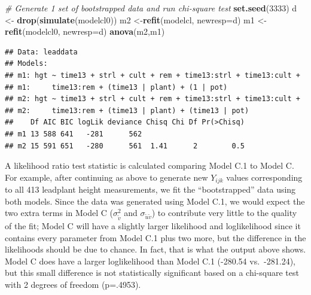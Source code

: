 \documentclass[
]{krantz}
\newenvironment{Shaded}{\begin{snugshade}}{\end{snugshade}}
\newcommand{\CommentTok}[1]{\textcolor[rgb]{0.37,0.37,0.37}{\textit{#1}}}
\newcommand{\DataTypeTok}[1]{\textcolor[rgb]{0.27,0.27,0.27}{#1}}
\newcommand{\DecValTok}[1]{\textcolor[rgb]{0.06,0.06,0.06}{#1}}
\newcommand{\KeywordTok}[1]{\textcolor[rgb]{0.27,0.27,0.27}{\textbf{#1}}}
\newcommand{\NormalTok}[1]{#1}
\newcommand{\StringTok}[1]{\textcolor[rgb]{0.5,0.5,0.5}{#1}}
\begin{document}
\begin{Shaded}
\begin{Highlighting}[]
\CommentTok{# Generate 1 set of bootstrapped data and run chi-square test}
\KeywordTok{set.seed}\NormalTok{(}\DecValTok{3333}\NormalTok{)}
\NormalTok{d <-}\StringTok{ }\KeywordTok{drop}\NormalTok{(}\KeywordTok{simulate}\NormalTok{(modelcl0))}
\NormalTok{m2 <-}\KeywordTok{refit}\NormalTok{(modelcl, }\DataTypeTok{newresp=}\NormalTok{d)}
\NormalTok{m1 <-}\KeywordTok{refit}\NormalTok{(modelcl0, }\DataTypeTok{newresp=}\NormalTok{d)}
\KeywordTok{anova}\NormalTok{(m2,m1)}
\end{Highlighting}
\end{Shaded}

\begin{verbatim}
## Data: leaddata
## Models:
## m1: hgt ~ time13 + strl + cult + rem + time13:strl + time13:cult + 
## m1:     time13:rem + (time13 | plant) + (1 | pot)
## m2: hgt ~ time13 + strl + cult + rem + time13:strl + time13:cult + 
## m2:     time13:rem + (time13 | plant) + (time13 | pot)
##    Df AIC BIC logLik deviance Chisq Chi Df Pr(>Chisq)
## m1 13 588 641   -281      562                        
## m2 15 591 651   -280      561  1.41      2        0.5
\end{verbatim}

A likelihood ratio test statistic is calculated comparing Model C.1 to Model C. For example, after continuing as above to generate new \(Y_{ijk}\) values corresponding to all 413 leadplant height measurements, we fit the ``bootstrapped'' data using both models. Since the data was generated using Model C.1, we would expect the two extra terms in Model C (\(\sigma^2_{\tilde{v}}\) and \(\sigma_{\tilde{u}\tilde{v}}\)) to contribute very little to the quality of the fit; Model C will have a slightly larger likelihood and loglikelihood since it contains every parameter from Model C.1 plus two more, but the difference in the likelihoods should be due to chance. In fact, that is what the output above shows. Model C does have a larger loglikelihood than Model C.1 (-280.54 vs.~-281.24), but this small difference is not statistically significant based on a chi-square test with 2 degrees of freedom (p=.4953).
\end{document}
